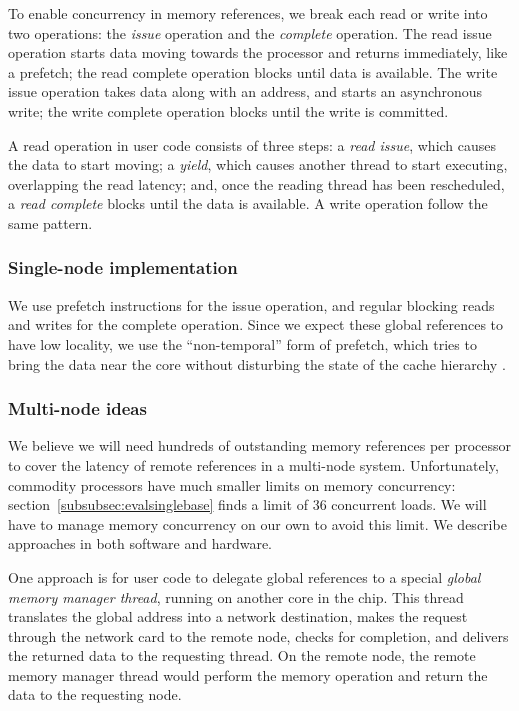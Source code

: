 \documentclass[10pt,nocopyrightspace,preprint]{sigplanconf}
\begin{document}
To enable concurrency in memory references, we break each read or
write into two operations: the {\em issue} operation and the {\em
  complete} operation. The read issue operation starts data moving
towards the processor and returns immediately, like a prefetch; the
read complete operation blocks until data is available. The write
issue operation takes data along with an address, and starts an
asynchronous write; the write complete operation blocks until the
write is committed.

A read operation in user code consists of three steps: a {\em read
  issue}, which causes the data to start moving; a {\em yield}, which
causes another thread to start executing, overlapping the read
latency; and, once the reading thread has been rescheduled, a {\em
  read complete} blocks until the data is available. A write operation
follow the same pattern.

\subsubsection{Single-node implementation}
We use prefetch instructions for the issue operation, and regular
blocking reads and writes for the complete operation. Since we expect
these global references to have low locality, we use the
``non-temporal'' form of prefetch, which tries to bring the data near
the core without disturbing the state of the cache
hierarchy \cite{intel:swdev}.

\subsubsection{Multi-node ideas}

We believe we will need hundreds of outstanding memory references per processor to
cover the latency of remote references in a multi-node
system. Unfortunately, commodity processors have much smaller limits
on memory concurrency: section~\ref{subsubsec:evalsinglebase} finds a limit of
36 concurrent loads. We will have to manage memory concurrency on our
own to avoid this limit. We describe approaches in both software and
hardware.

One approach is for user code to delegate global references to a
special {\em global memory manager thread}, running on another core in
the chip. This thread translates the global address into a network
destination, makes the request through the network card to the remote
node, checks for completion, and delivers the returned data to the
requesting thread. On the remote node, the remote memory manager
thread would perform the memory operation and return the data to the
requesting node.
\end{document}
